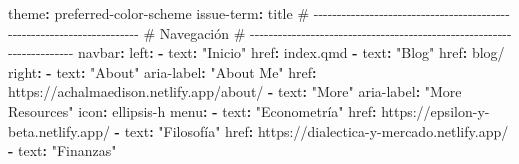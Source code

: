 \documentclass[
  doc,
  floatsintext,
  longtable,
  a4paper,
  nolmodern,
  notxfonts,
  notimes,
  12pt,
  colorlinks=true,linkcolor=blue,citecolor=blue,urlcolor=blue]{apa7}
\newenvironment{Shaded}{\begin{snugshade}}{\end{snugshade}}
\newcommand{\AttributeTok}[1]{\textcolor[rgb]{0.40,0.45,0.13}{#1}}
\newcommand{\CommentTok}[1]{\textcolor[rgb]{0.37,0.37,0.37}{#1}}
\newcommand{\FunctionTok}[1]{\textcolor[rgb]{0.28,0.35,0.67}{#1}}
\newcommand{\KeywordTok}[1]{\textcolor[rgb]{0.00,0.23,0.31}{\textbf{#1}}}
\newcommand{\StringTok}[1]{\textcolor[rgb]{0.13,0.47,0.30}{#1}}
\begin{document}
\begin{Shaded}
\begin{Highlighting}[]
\AttributeTok{      }\FunctionTok{theme}\KeywordTok{:}\AttributeTok{ preferred{-}color{-}scheme}
\AttributeTok{      }\FunctionTok{issue{-}term}\KeywordTok{:}\AttributeTok{ title}
\AttributeTok{  }
\CommentTok{  \# {-}{-}{-}{-}{-}{-}{-}{-}{-}{-}{-}{-}{-}{-}{-}{-}{-}{-}{-}{-}{-}{-}{-}{-}{-}{-}{-}{-}{-}{-}{-}{-}{-}{-}{-}{-}{-}{-}{-}{-}{-}{-}{-}{-}{-}{-}{-}{-}{-}{-}{-}{-}{-}{-}{-}{-}{-}{-}{-}{-}{-}{-}{-}{-}{-}{-}{-}{-}{-}{-}}
\CommentTok{  \# Navegación}
\CommentTok{  \# {-}{-}{-}{-}{-}{-}{-}{-}{-}{-}{-}{-}{-}{-}{-}{-}{-}{-}{-}{-}{-}{-}{-}{-}{-}{-}{-}{-}{-}{-}{-}{-}{-}{-}{-}{-}{-}{-}{-}{-}{-}{-}{-}{-}{-}{-}{-}{-}{-}{-}{-}{-}{-}{-}{-}{-}{-}{-}{-}{-}{-}{-}{-}{-}{-}{-}{-}{-}{-}{-}}
\AttributeTok{  }\FunctionTok{navbar}\KeywordTok{:}
\AttributeTok{    }\FunctionTok{left}\KeywordTok{:}
\AttributeTok{      }\KeywordTok{{-}}\AttributeTok{ }\FunctionTok{text}\KeywordTok{:}\AttributeTok{ }\StringTok{"Inicio"}
\AttributeTok{        }\FunctionTok{href}\KeywordTok{:}\AttributeTok{ index.qmd}
\AttributeTok{      }\KeywordTok{{-}}\AttributeTok{ }\FunctionTok{text}\KeywordTok{:}\AttributeTok{ }\StringTok{"Blog"}
\AttributeTok{        }\FunctionTok{href}\KeywordTok{:}\AttributeTok{ blog/}
\AttributeTok{        }
\AttributeTok{    }\FunctionTok{right}\KeywordTok{:}
\AttributeTok{      }\KeywordTok{{-}}\AttributeTok{ }\FunctionTok{text}\KeywordTok{:}\AttributeTok{ }\StringTok{"About"}
\AttributeTok{        }\FunctionTok{aria{-}label}\KeywordTok{:}\AttributeTok{ }\StringTok{"About Me"}
\AttributeTok{        }\FunctionTok{href}\KeywordTok{:}\AttributeTok{ https://achalmaedison.netlify.app/about/}
\AttributeTok{        }
\AttributeTok{      }\KeywordTok{{-}}\AttributeTok{ }\FunctionTok{text}\KeywordTok{:}\AttributeTok{ }\StringTok{"More"}
\AttributeTok{        }\FunctionTok{aria{-}label}\KeywordTok{:}\AttributeTok{ }\StringTok{"More Resources"}
\AttributeTok{        }\FunctionTok{icon}\KeywordTok{:}\AttributeTok{ ellipsis{-}h}
\AttributeTok{        }\FunctionTok{menu}\KeywordTok{:}
\AttributeTok{          }\KeywordTok{{-}}\AttributeTok{ }\FunctionTok{text}\KeywordTok{:}\AttributeTok{ }\StringTok{"Econometría"}
\AttributeTok{            }\FunctionTok{href}\KeywordTok{:}\AttributeTok{ https://epsilon{-}y{-}beta.netlify.app/}
\AttributeTok{          }\KeywordTok{{-}}\AttributeTok{ }\FunctionTok{text}\KeywordTok{:}\AttributeTok{ }\StringTok{"Filosofía"}
\AttributeTok{            }\FunctionTok{href}\KeywordTok{:}\AttributeTok{ https://dialectica{-}y{-}mercado.netlify.app/}
\AttributeTok{          }\KeywordTok{{-}}\AttributeTok{ }\FunctionTok{text}\KeywordTok{:}\AttributeTok{ }\StringTok{"Finanzas"}

\end{Highlighting}
\end{Shaded}
\end{document}
